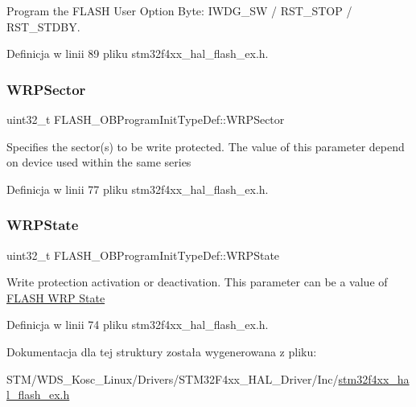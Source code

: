 Program the F\+L\+A\+SH User Option Byte\+: I\+W\+D\+G\+\_\+\+SW / R\+S\+T\+\_\+\+S\+T\+OP / R\+S\+T\+\_\+\+S\+T\+D\+BY. 

Definicja w linii 89 pliku stm32f4xx\+\_\+hal\+\_\+flash\+\_\+ex.\+h.

\mbox{\label{struct_f_l_a_s_h___o_b_program_init_type_def_aa3db423f4b3038a56b67ca2d48af79ff}} 
\subsubsection{\texorpdfstring{W\+R\+P\+Sector}{WRPSector}}
{\footnotesize\ttfamily uint32\+\_\+t F\+L\+A\+S\+H\+\_\+\+O\+B\+Program\+Init\+Type\+Def\+::\+W\+R\+P\+Sector}

Specifies the sector(s) to be write protected. The value of this parameter depend on device used within the same series 

Definicja w linii 77 pliku stm32f4xx\+\_\+hal\+\_\+flash\+\_\+ex.\+h.

\mbox{\label{struct_f_l_a_s_h___o_b_program_init_type_def_a2607ba046f7a3af46e7209b8f1e9e20d}} 
\subsubsection{\texorpdfstring{W\+R\+P\+State}{WRPState}}
{\footnotesize\ttfamily uint32\+\_\+t F\+L\+A\+S\+H\+\_\+\+O\+B\+Program\+Init\+Type\+Def\+::\+W\+R\+P\+State}

Write protection activation or deactivation. This parameter can be a value of \hyperlink{group___f_l_a_s_h_ex___w_r_p___state}{F\+L\+A\+SH W\+RP State} 

Definicja w linii 74 pliku stm32f4xx\+\_\+hal\+\_\+flash\+\_\+ex.\+h.



Dokumentacja dla tej struktury została wygenerowana z pliku\+:\begin{DoxyCompactItemize}
\item 
S\+T\+M/\+W\+D\+S\+\_\+\+Kosc\+\_\+\+Linux/\+Drivers/\+S\+T\+M32\+F4xx\+\_\+\+H\+A\+L\+\_\+\+Driver/\+Inc/\hyperlink{stm32f4xx__hal__flash__ex_8h}{stm32f4xx\+\_\+hal\+\_\+flash\+\_\+ex.\+h}\end{DoxyCompactItemize}
